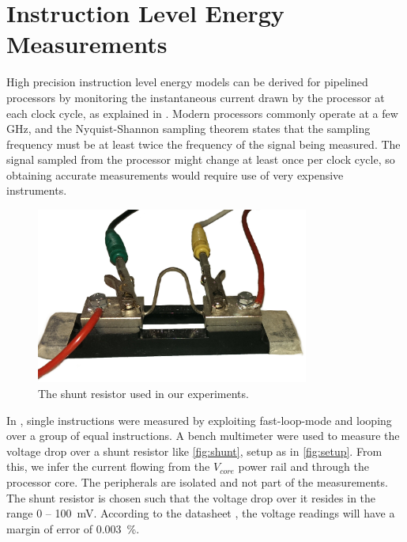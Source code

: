 \section{Instruction Level Energy Measurements}
\label{sec:energymeasure}

High precision instruction level energy models can be derived for pipelined
processors by monitoring the instantaneous current drawn by the processor at
each clock cycle, as explained in \cite{nikolaidis2005instruction}. Modern
processors commonly operate at a few GHz, and the Nyquist-Shannon sampling theorem
\cite{nyquist1928certain} states that the sampling frequency must be at least
twice the frequency of the signal being measured. The signal sampled from the
processor might change at least once per clock cycle, so obtaining accurate
measurements would require use of very expensive instruments.

\begin{figure}[tbh]
    \centering
    \includegraphics[width=0.8\textwidth]{figs/shunt.jpg}
    \caption{The shunt resistor used in our experiments.}
    \label{fig:shunt}
\end{figure}

In \cite{rundehvatum2013exploring}, single instructions were measured by
exploiting fast-loop-mode \cite{a9whitepaper} and looping over a group of equal
instructions. A bench multimeter were used to measure the voltage drop over a
shunt resistor like \autoref{fig:shunt}, setup as in \autoref{fig:setup}. From
this, we infer the current flowing from the $V_{core}$ power rail and through
the processor core. The peripherals are isolated and not part of the
measurements. The shunt resistor is chosen such that the voltage drop over it
resides in the range 0 -- 100~mV. According to the datasheet
\cite{agilent34410a}, the voltage readings will have a margin of error of
0.003~\%.

